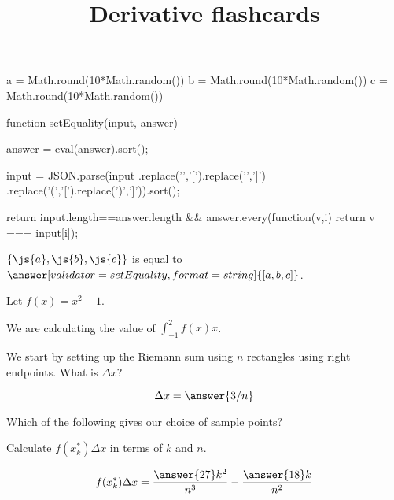 \documentclass{ximera}
\title{Derivative flashcards}
\begin{document}
\begin{javascript}
  a = Math.round(10*Math.random())
  b = Math.round(10*Math.random())
  c = Math.round(10*Math.random())  

  function setEquality(input, answer) {
    answer = eval(answer).sort();
    
    input = JSON.parse(input
      .replace('{','[').replace('}',']')
      .replace('(','[').replace(')',']')).sort();
    
     return input.length==answer.length &&
       answer.every(function(v,i) { return v === input[i]});
   }

\end{javascript}

\begin{problem}
  $\{\js{a},\js{b},\js{c}\}$ is equal to $\answer[validator=setEquality,format=string]{[a,b,c]}$.
\end{problem}

\begin{exercise}
Let $f(x) = x^2-1$.

We are calculating the value of $\displaystyle \int_{-1}^{2} f(x)  x$.
 

We start by setting up the Riemann sum using $n$ rectangles using right endpoints.
What is $\Delta x$?
     
\[ \Delta x = \answer{3/n} \]

\begin{exercise}
  Which of the following gives our choice of sample points?
  \begin{multipleChoice}
  \end{multipleChoice}
  
  \begin{exercise}
    Calculate $f(x_k^*) \Delta x$ in terms of $k$ and $n$.
    
    \[ f(x_k^*) \Delta x = \frac{\answer{27}k^2}{n^3}-\frac{\answer{18}k}{n^2} \]
  \end{exercise}
\end{exercise}
\end{exercise}
\end{document}
